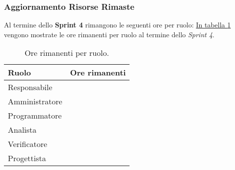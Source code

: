 \subsubsection{Aggiornamento Risorse Rimaste}
Al termine dello \textbf{Sprint 4} rimangono le seguenti ore per ruolo: \hyperref[tab:sprint4_ore_rimanenti]{In tabella \ref{tab:sprint4_ore_rimanenti}} vengono mostrate le ore rimanenti per ruolo al termine dello \textit{Sprint 4}.

\begin{table}[H]
    \centering
    \begin{tabular}{| l | l |}
    \hline
    \textbf{Ruolo} & 
    \textbf{Ore rimanenti}\\
    \hline
        Responsabile & \\
    \hline
        Amministratore & \\
    \hline
        Programmatore & \\
    \hline
        Analista & \\
    \hline
        Verificatore & \\
    \hline
        Progettista & \\
    \hline
    \end{tabular}
    \caption{Ore rimanenti per ruolo.}
    \label{tab:sprint4_ore_rimanenti} 
\end{table}